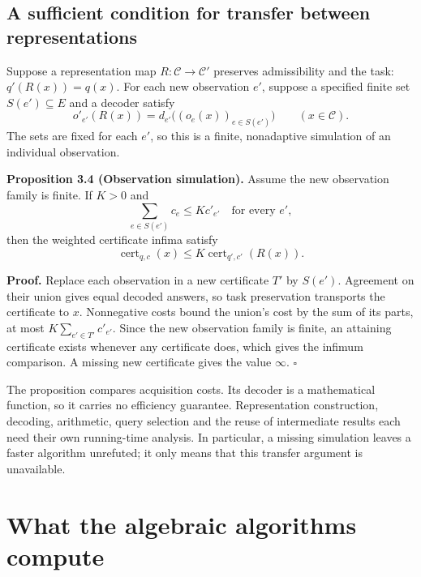 \documentclass[11pt,letterpaper]{article}
\newenvironment{manualstatement}{%
  \par\addvspace{0.7\baselineskip}\begingroup\itshape\noindent\ignorespaces
}{\par\endgroup\addvspace{0.4\baselineskip}}
\newenvironment{manualproof}{%
  \par\addvspace{0.4\baselineskip}\begingroup\normalfont\noindent\ignorespaces
}{\par\endgroup\addvspace{0.5\baselineskip}}
\begin{document}
\subsection{A sufficient condition for transfer between
representations}\label{a-sufficient-condition-for-transfer-between-representations}

Suppose a representation map \(R:\mathcal C\to\mathcal C'\) preserves
admissibility and the task: \(q'(R(x))=q(x)\). For each new observation
\(e'\), suppose a specified finite set \(S(e')\subseteq E\) and a
decoder satisfy \[o'_{e'}(R(x))=
 d_{e'}\bigl((o_e(x))_{e\in S(e')}\bigr)
\qquad(x\in\mathcal C).\] The sets are fixed for each \(e'\), so this is
a finite, nonadaptive simulation of an individual observation.

\begin{manualstatement}

{{\upshape \textbf{Proposition 3.4 (Observation simulation).}}} Assume
the new observation family is finite. If \(K>0\) and
\[\sum_{e\in S(e')}c_e\le Kc'_{e'}
\quad\text{for every }e',\] then the weighted certificate infima satisfy
\[\operatorname{cert}_{q,c}(x)
\le K\operatorname{cert}_{q',c'}(R(x)).\]

\end{manualstatement}

\begin{manualproof}

\textbf{Proof.} Replace each observation in a new certificate \(T'\) by
\(S(e')\). Agreement on their union gives equal decoded answers, so task
preservation transports the certificate to \(x\). Nonnegative costs
bound the union's cost by the sum of its parts, at most
\(K\sum_{e'\in T'}c'_{e'}\). Since the new observation family is finite,
an attaining certificate exists whenever any certificate does, which
gives the infimum comparison. A missing new certificate gives the value
\(\infty\). \(\square\)

\end{manualproof}

The proposition compares acquisition costs. Its decoder is a
mathematical function, so it carries no efficiency guarantee.
Representation construction, decoding, arithmetic, query selection and
the reuse of intermediate results each need their own running-time
analysis. In particular, a missing simulation leaves a faster algorithm
unrefuted; it only means that this transfer argument is unavailable.

\section{What the algebraic algorithms
compute}\label{what-the-algebraic-algorithms-compute}
\end{document}
